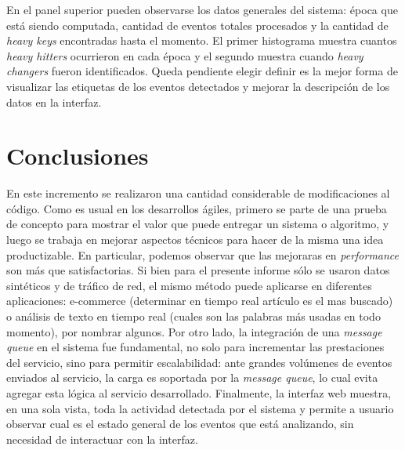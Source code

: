 \documentclass[a4paper,10pt, oneside]{article}
\begin{document}
En el panel superior pueden observarse los datos generales del sistema: época que está siendo computada, cantidad de eventos totales procesados y la cantidad de \textit{heavy keys} encontradas hasta el momento. El primer histograma muestra cuantos \textit{heavy hitters} ocurrieron en cada época y el segundo muestra cuando \textit{heavy changers} fueron identificados. Queda pendiente elegir definir es la mejor forma de visualizar las etiquetas de los eventos detectados y mejorar la descripción de los datos en la interfaz.

\section{Conclusiones}
En este incremento se realizaron una cantidad considerable de modificaciones al código. Como es usual en los desarrollos ágiles, primero se parte de una prueba de concepto para mostrar el valor que puede entregar un sistema o algoritmo, y luego se trabaja en mejorar aspectos técnicos para hacer de la misma una idea productizable.
En particular, podemos observar que las mejoraras en \textit{performance} son más que satisfactorias. Si bien para el presente informe sólo se usaron datos sintéticos y de tráfico de red, el mismo método puede aplicarse en diferentes aplicaciones: e-commerce (determinar en tiempo real artículo es el mas buscado) o análisis de texto en tiempo real (cuales son las palabras más usadas en todo momento), por nombrar algunos.
Por otro lado, la integración de una \textit{message queue} en el sistema fue fundamental, no solo para incrementar las prestaciones del servicio, sino para permitir escalabilidad: ante grandes volúmenes de eventos enviados al servicio, la carga es soportada por la \textit{message queue}, lo cual evita agregar esta lógica al servicio desarrollado.
Finalmente, la interfaz web muestra, en una sola vista, toda la actividad detectada por el sistema y permite a usuario observar cual es el estado general de los eventos que está analizando, sin necesidad de interactuar con la interfaz.
\newpage
\nocite{*}
\printbibliography
\end{document}
